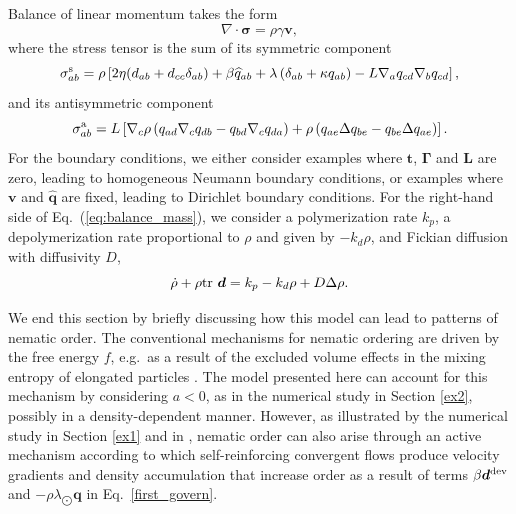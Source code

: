 \documentclass[12pt]{iopart}
\begin{document}
	Balance of linear momentum takes the form
	\begin{equation}
		\label{eq:balance_forces_linear}
		\nabla\cdot\bm{\sigma} = \rho \gamma \bm{v},
	\end{equation}
	where the stress tensor is the sum of its symmetric component
	\begin{equation}
		\sigma^{\rm s}_{ab} = \rho \left[2\eta  (d_{ab}+d_{cc} \delta_{ab}) + \beta  \widehat{q}_{ab}  + \lambda \left(\delta_{ab} + \kappa q_{ab}\right) -L\nabla_a q_{cd} \nabla_b q_{cd}\right],
	\end{equation}
	and its antisymmetric component 
	\begin{equation}
		\sigma^{\rm a}_{ab} = L \left[\nabla_c \rho \left( q_{ad} \nabla_c q_{db}  - q_{bd} \nabla_c q_{da}  \right)   + \rho  \left(q_{ae}\Delta q_{be}  -q_{be}  \Delta q_{ae}  \right) \right].
	\end{equation}
	For the boundary conditions, we either consider examples where $\bm{t}$, $\bm{\Gamma}$ and $\bm{L}$ are zero, leading to homogeneous Neumann boundary conditions, or examples where $\bm{v}$ and $\widehat{\bm{q}}$ are fixed, leading to Dirichlet boundary conditions. For the right-hand side of Eq.~(\ref{eq:balance_mass}), we consider a polymerization rate $k_p$, a depolymerization rate proportional to $\rho$ and given by $-k_d \rho$, and Fickian diffusion with diffusivity $D$,
	\begin{equation} \label{last_govern}
		\dot{\rho} + \rho {\rm tr}~\bm{d} = k_p - k_d \rho + D \Delta \rho.
	\end{equation}
	
	We end this section by briefly discussing how this model can lead to patterns of nematic order. The conventional mechanisms for nematic ordering are driven by the free energy $f$, e.g.~as a result of the excluded volume effects in the mixing entropy of elongated particles \cite{Onsager_shape,de1993,D0SM01733G}. The model presented here can account for this mechanism by considering $a<0$, as in the numerical study in Section \ref{ex2}, possibly in a density-dependent manner. However, as illustrated by the numerical study in Section \ref{ex1} and in \cite{mirza2022}, nematic order can also arise through an active mechanism according to which self-reinforcing convergent flows produce velocity gradients and density accumulation  that increase order as a result of terms $\beta \bm{d}^{\rm dev}$ and $- \rho\lambda_{\bigodot} \bm{q}$ in Eq.~\ref{first_govern}.
	
	
	
\end{document}
